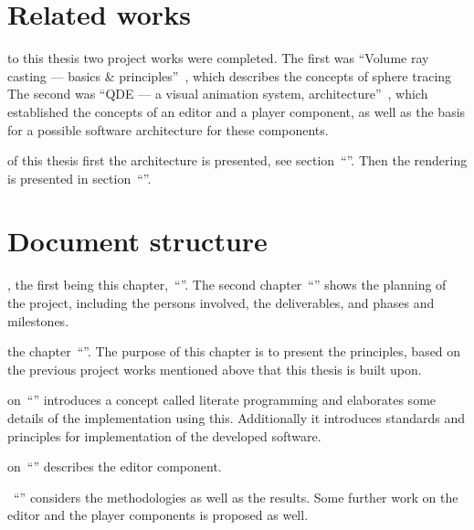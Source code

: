 \documentclass[%
    a4paper,    %
    justified,  %
    nobib,      %
    openany     %
]{tufte-book}
\makeatletter
\renewcommand{\label}[1]{\@tufte@label{##1}}%
\makeatother
\begin{document}
\section{Related works}
\label{sec:related-works}

 to this thesis two project works were completed.
The first was \enquote{Volume ray casting --- basics \&
principles}~\cite{osterwalder-volume-2016}, which describes the concepts
of sphere tracing The second was \enquote{QDE
--- a visual animation system, architecture}~\cite{osterwalder-qde-2016}, which
established the concepts of an editor and a player component, as well as
the basis for a possible software architecture for these components.

 of this thesis first the
architecture is presented, see section~\enquote{}. Then the rendering is
presented in section~\enquote{}.

\section{Document structure}
\label{sec:document-structure}

, the first being this
chapter,~\enquote{}. The second
chapter~\enquote{} shows the planning of
the project, including the persons involved, the deliverables, and phases and
milestones.

 the
chapter~\enquote{}. The purpose of this chapter is to
present the principles, based on the previous project works mentioned above that
this thesis is built upon.

 on~\enquote{}
introduces a concept called literate programming and elaborates some details of
the implementation using this. Additionally it introduces standards and
principles for implementation of the developed software.

 on~\enquote{}
describes the editor component.

~\enquote{}
considers the methodologies as well as the results. Some further work on the
editor and the player components is proposed as well.
\end{document}
